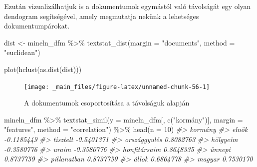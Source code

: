 \documentclass[
]{book}
\newenvironment{Shaded}{\begin{snugshade}}{\end{snugshade}}
\newcommand{\AttributeTok}[1]{\textcolor[rgb]{0.77,0.63,0.00}{#1}}
\newcommand{\CommentTok}[1]{\textcolor[rgb]{0.56,0.35,0.01}{\textit{#1}}}
\newcommand{\DecValTok}[1]{\textcolor[rgb]{0.00,0.00,0.81}{#1}}
\newcommand{\FunctionTok}[1]{\textcolor[rgb]{0.00,0.00,0.00}{#1}}
\newcommand{\NormalTok}[1]{#1}
\newcommand{\OtherTok}[1]{\textcolor[rgb]{0.56,0.35,0.01}{#1}}
\newcommand{\SpecialCharTok}[1]{\textcolor[rgb]{0.00,0.00,0.00}{#1}}
\newcommand{\StringTok}[1]{\textcolor[rgb]{0.31,0.60,0.02}{#1}}
\begin{document}
Ezután vizualizálhatjuk is a dokumentumok egymástól való távolságát egy
olyan dendogram segítségével, amely megmutatja nekünk a lehetséges
dokumentumpárokat.

\begin{Shaded}
\begin{Highlighting}[]
\NormalTok{dist }\OtherTok{\textless{}{-}}\NormalTok{ mineln\_dfm }\SpecialCharTok{\%\textgreater{}\%}
  \FunctionTok{textstat\_dist}\NormalTok{(}\AttributeTok{margin =} \StringTok{"documents"}\NormalTok{, }\AttributeTok{method =} \StringTok{"euclidean"}\NormalTok{)}
\end{Highlighting}
\end{Shaded}

\begin{Shaded}
\begin{Highlighting}[]
\FunctionTok{plot}\NormalTok{(}\FunctionTok{hclust}\NormalTok{(}\FunctionTok{as.dist}\NormalTok{(dist)))}
\end{Highlighting}
\end{Shaded}

\begin{figure}

{\centering \texttt{[image: \_main\_files/figure-latex/unnamed-chunk-56-1]} 

}

\caption{A dokumentumok csoportosítása a távolságuk alapján}\label{fig:unnamed-chunk-56}
\end{figure}

\begin{Shaded}
\begin{Highlighting}[]
\NormalTok{mineln\_dfm }\SpecialCharTok{\%\textgreater{}\%}
  \FunctionTok{textstat\_simil}\NormalTok{(}\AttributeTok{y =}\NormalTok{ mineln\_dfm[, }\FunctionTok{c}\NormalTok{(}\StringTok{"kormány"}\NormalTok{)], }\AttributeTok{margin =} \StringTok{"features"}\NormalTok{, }\AttributeTok{method =} \StringTok{"correlation"}\NormalTok{) }\SpecialCharTok{\%\textgreater{}\%}
  \FunctionTok{head}\NormalTok{(}\AttributeTok{n =} \DecValTok{10}\NormalTok{)}
\CommentTok{\#\textgreater{}                 kormány}
\CommentTok{\#\textgreater{} elnök        {-}0.1185449}
\CommentTok{\#\textgreater{} tisztelt     {-}0.5401371}
\CommentTok{\#\textgreater{} országgyulés  0.8082763}
\CommentTok{\#\textgreater{} hölgyeim     {-}0.3580776}
\CommentTok{\#\textgreater{} uraim        {-}0.3580776}
\CommentTok{\#\textgreater{} honfitársaim  0.8648335}
\CommentTok{\#\textgreater{} ünnepi        0.8737759}
\CommentTok{\#\textgreater{} pillanatban   0.8737759}
\CommentTok{\#\textgreater{} állok         0.6864778}
\CommentTok{\#\textgreater{} magyar        0.7530170}
\end{Highlighting}
\end{Shaded}
\end{document}
